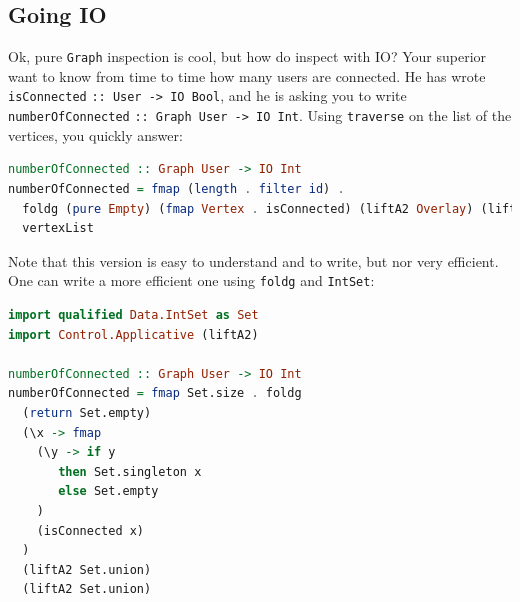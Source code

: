\documentclass[10pt,a4paper]{article}
\begin{document}
\subsection{Going IO}
Ok, pure \verb|Graph| inspection is cool, but how do inspect with IO? Your superior want to know from time to time how many users are connected. He has wrote \verb|isConnected| \verb|:: User -> IO Bool|, and he is asking you to write \verb|numberOfConnected| \verb|:: Graph User -> IO Int|. Using \verb|traverse| on the list of the vertices, you quickly answer:
\begin{lstlisting}[language=Haskell, frame=single]
numberOfConnected :: Graph User -> IO Int
numberOfConnected = fmap (length . filter id) .
  foldg (pure Empty) (fmap Vertex . isConnected) (liftA2 Overlay) (liftA2 Connect) .
  vertexList
\end{lstlisting}

Note that this version is easy to understand and to write, but nor very efficient. One can write a more efficient one using \verb|foldg| and \verb|IntSet|:
\begin{lstlisting}[language=Haskell, frame=single]
import qualified Data.IntSet as Set
import Control.Applicative (liftA2)

numberOfConnected :: Graph User -> IO Int
numberOfConnected = fmap Set.size . foldg
  (return Set.empty)
  (\x -> fmap
    (\y -> if y
       then Set.singleton x
       else Set.empty
    )
    (isConnected x)
  )
  (liftA2 Set.union)
  (liftA2 Set.union)
\end{lstlisting}
\end{document}
